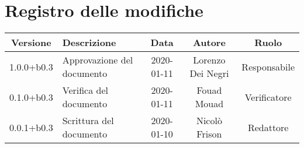 \section*{Registro delle modifiche}

\begin{center}
	\begin{longtable}{|c|p{3cm}|c|c|c|}
	\hline
	\rowcolor{lighter-grayer}
	\textbf{Versione} & \textbf{Descrizione} & \textbf{Data} & \textbf{Autore} & \textbf{Ruolo} \\
	\hline
	\endfirsthead


	1.0.0+b0.3 & Approvazione del documento & 2020-01-11 & Lorenzo Dei Negri & Responsabile \\
	\hline
	0.1.0+b0.3 & Verifica del documento & 2020-01-11 & Fouad Mouad & Verificatore \\
	\hline
	0.0.1+b0.3 & Scrittura del documento & 2020-01-10 & Nicolò Frison & Redattore \\
	\hline

	\end{longtable}
\end{center}